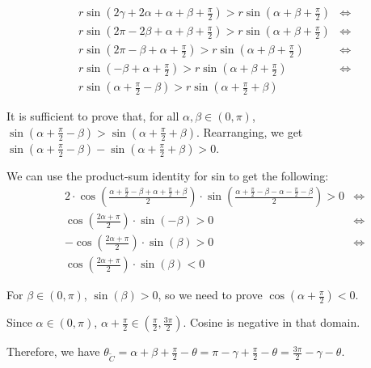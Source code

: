 \documentclass[a4paper,12pt]{article}
\newcommand{\HSview}[1][V]{\widetilde{#1}}
\theoremstyle{definition}
\theoremstyle{plain}
\begin{document}
	\begin{align*}
		& r\sin\left(2\gamma + 2\alpha + \alpha + \beta + \frac{\pi}{2}\right) >
		  r\sin\left(\alpha + \beta + \frac{\pi}{2}\right) & \iff \\
		& r\sin\left(2\pi - 2\beta + \alpha + \beta + \frac{\pi}{2}\right) >
		  r\sin\left(\alpha + \beta + \frac{\pi}{2}\right) & \iff \\
		& r\sin\left(2\pi - \beta + \alpha + \frac{\pi}{2}\right) >
		  r\sin\left(\alpha + \beta + \frac{\pi}{2}\right) & \iff \\
		& r\sin\left(- \beta + \alpha + \frac{\pi}{2}\right) >
		  r\sin\left(\alpha + \beta + \frac{\pi}{2}\right) & \iff \\
		& r\sin\left(\alpha + \frac{\pi}{2} - \beta\right) >
		  r\sin\left(\alpha + \frac{\pi}{2} + \beta\right)
	\end{align*}

	It is sufficient to prove that, for all $\alpha, \beta \in \left(0, \pi\right)$, 
	$\sin\left(\alpha + \frac{\pi}{2} - \beta\right) >
	 \sin\left(\alpha + \frac{\pi}{2} + \beta\right)$.
	Rearranging, we get
	$\sin\left(\alpha + \frac{\pi}{2} - \beta\right) - \sin\left(\alpha + \frac{\pi}{2} + \beta\right) > 0$.

	We can use the product-sum identity for sin to get the following:
	\begin{align*}
		& 2\cdot\cos\left(\frac{\alpha + \frac{\pi}{2} - \beta + \alpha + \frac{\pi}{2} + \beta}{2}\right) \cdot
	    \sin\left(\frac{\alpha + \frac{\pi}{2} - \beta - \alpha - \frac{\pi}{2} - \beta}{2}\right) > 0 & \iff \\
		& \cos\left(\frac{2\alpha + \pi}{2}\right) \cdot
		  \sin\left(-\beta\right) > 0 & \iff \\
		& -\cos\left(\frac{2\alpha + \pi}{2}\right) \cdot
		  \sin\left(\beta\right) > 0 & \iff \\
	  & \cos\left(\frac{2\alpha + \pi}{2}\right) \cdot
	    \sin\left(\beta\right) < 0
	\end{align*}


	For $\beta \in \left(0, \pi\right)$, $\sin\left(\beta\right) > 0$, so we need to prove
	$\cos\left(\alpha + \frac{\pi}{2}\right) < 0$.

	Since 
	$\alpha \in \left(0, \pi\right)$, $\alpha + \frac{\pi}{2} \in \left(\frac{\pi}{2}, \frac{3\pi}{2}\right)$.
	Cosine is negative in that domain.

	Therefore, we have $\theta_{\HSview[C]} = \alpha + \beta + \frac{\pi}{2} - \theta = \pi - \gamma + \frac{\pi}{2} - \theta = \frac{3\pi}{2} - \gamma - \theta$.
\end{document}
